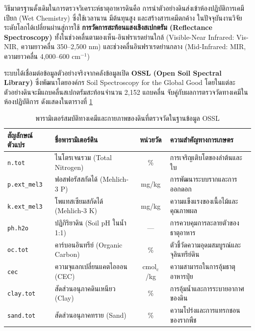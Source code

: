 \label{sec:soil_spectroscopy}

วิธีมาตรฐานดั้งเดิมในการตรวจวิเคราะห์ธาตุอาหารดินคือ การนำตัวอย่างดินส่งเข้าห้องปฏิบัติการเคมีเปียก (Wet Chemistry) ซึ่งใช้เวลานาน มีต้นทุนสูง และสร้างสารเคมีตกค้าง ในปัจจุบันงานวิจัยระดับโลกได้เปลี่ยนผ่านสู่การใช้ \textbf{การวัดการสะท้อนแสงเชิงสเปกตรัม (Reflectance Spectroscopy)} ทั้งในช่วงคลื่นตามองเห็น-อินฟราเรดย่านใกล้ (Visible-Near Infrared: Vis-NIR, ความยาวคลื่น 350--2,500 nm) และช่วงคลื่นอินฟราเรดย่านกลาง (Mid-Infrared: MIR, ความยาวคลื่น 4,000--600 cm$^{-1}$)

ระบบได้เชื่อมต่อข้อมูลตัวอย่างจริงจากคลังข้อมูลเปิด \textbf{OSSL (Open Soil Spectral Library)} ซึ่งพัฒนาโดยองค์กร Soil Spectroscopy for the Global Good โดยในแต่ละตัวอย่างดินจะมีแถบคลื่นสเปกตรัมสะท้อนจำนวน 2,152 แถบคลื่น จับคู่กับผลการตรวจวัดทางเคมีในห้องปฏิบัติการ ดังแสดงในตารางที่ \ref{tab:ossl_properties}

\begin{table}[htbp]
\caption{พารามิเตอร์สมบัติทางเคมีและกายภาพของดินที่ตรวจวัดในฐานข้อมูล OSSL}
\label{tab:ossl_properties}
\centering
\fontsize{9}{12}\selectfont
\begin{tabularx}{\textwidth}{llcX}
\toprule
\textbf{สัญลักษณ์ตัวแปร} & \textbf{ชื่อพารามิเตอร์ดิน} & \textbf{หน่วยวัด} & \textbf{ความสำคัญทางการเกษตร} \\
\midrule
\texttt{n.tot} & ไนโตรเจนรวม (Total Nitrogen) & \% & การเจริญเติบโตของลำต้นและใบ \\
\texttt{p.ext\_mel3} & ฟอสฟอรัสสกัดได้ (Mehlich-3 P) & mg/kg & การพัฒนาระบบรากและการออกดอก \\
\texttt{k.ext\_mel3} & โพแทสเซียมสกัดได้ (Mehlich-3 K) & mg/kg & ความแข็งแรงของเนื้อไม้และคุณภาพผล \\
\texttt{ph.h2o} & ปฏิกิริยาดิน (Soil pH ในน้ำ 1:1) & --- & การควบคุมการละลายตัวของธาตุอาหาร \\
\texttt{oc.tot} & คาร์บอนอินทรีย์ (Organic Carbon) & \% & ตัวชี้วัดความอุดมสมบูรณ์และจุลินทรีย์ดิน \\
\texttt{cec} & ความจุแลกเปลี่ยนแคตไอออน (CEC) & cmol$_\text{c}$/kg & ความสามารถในการอุ้มธาตุอาหารปุ๋ย \\
\texttt{clay.tot} & สัดส่วนอนุภาคดินเหนียว (Clay) & \% & การอุ้มน้ำและการระบายอากาศของดิน \\
\texttt{sand.tot} & สัดส่วนอนุภาคทราย (Sand) & \% & ความโปร่งและการแทรกชอนของรากพืช \\
\bottomrule
\end{tabularx}
\end{table}

